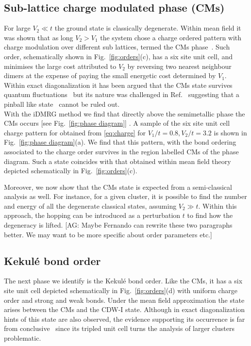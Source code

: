 \documentclass[aps,prx,10pt,twocolumn,floatfix,superscriptaddress,showpacs,numerical,footinbib]{revtex4-1}
\newcommand{\noteAG}[1]{{\color{blue} [AG: #1]}}
\begin{document}
\subsection{Sub-lattice charge modulated phase (CMs)}
%
For large $V_{2}\ll t$ the ground state is classically degenerate. 
%
Within mean field it was shown that as long $V_{2}>V_{1}$
the system chose a charge ordered pattern with charge modulation over different sub lattices, termed the CMs phase~\cite{GCC13}.
%
Such order, schematically shown in Fig.~\ref{fig:orders}(c), has a six site unit cell, and minimises the large cost
attributed to $V_{2}$ by reversing two nearest neighbour dimers at the expense of paying the small energetic cost
determined by $V_{1}$.
%
Within exact diagonalization it has been argued that the CMs state survives quantum fluctuations~\cite{GGNVC13,DH14,DCH14} 
but its nature was challenged in Ref.~ suggesting that a pinball like state~\cite{HF06,MRF13} cannot be ruled out.\\
%
With the iDMRG method we find that directly above the semimetallic phase the CMs occurs [see Fig.~\ref{fig:phase diagram}] .
%
A sample of the six site unit cell charge pattern for obtained from \eqref{eq:charge} for $V_1/t = 0.8, V_2/t = 3.2 $ is shown in Fig.~\ref{fig:phase diagram}(a).
%
We find that this pattern, with the bond ordering associated to the charge order survives in the region labelled CMs of the phase diagram.
%
Such a state coincides with that obtained within mean field theory~\cite{GCC13} depicted schematically in Fig.~\ref{fig:orders}(c).

% 
Moreover, we now show that the CMs state is expected from a semi-classical analysis as well.
%
For instance, for a given cluster, it is possible to find the number and energy of all the degenerate classical states, assuming $V_{2}\gg t$.
%
Within this approach, the hopping can be introduced as a perturbation $t$ to find how the degeneracy is lifted.
\noteAG{Maybe Fernando can rewrite these two paragraphs better. We may want to be more specific about order parameters etc.} 


\subsection{Kekul\'{e} bond order}
%
The next phase we identify is the Kekul\'{e}
bond order.
%
Like the CMs, it has a six site unit cell depicted schematically in Fig.~\ref{fig:orders}(d)
with uniform charge order and strong and weak bonds.
%
Under the mean field approximation the state arises between the CMs and the CDW-I state.
%
Although in exact diagonalization hints of this state are also observed,
the evidence supporting its occurrence is far from conclusive~\cite{GGNVC13} since
its tripled unit cell turns the analysis of larger clusters problematic.
%
\end{document}
